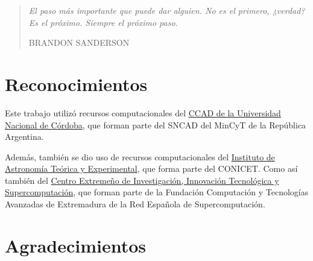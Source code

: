 \documentclass[spanish,a4paper,oneside,10pt,openright]{book}
\newenvironment{dedication}
    {\vspace{6ex}\begin{quotation}\begin{center}\begin{em}}
    {\par\end{em}\end{center}\end{quotation}}
\begin{document}
\setcounter{secnumdepth}{3}

 \cleardoublepage


\cleardoublepage






\begin{dedication}
\thispagestyle{empty}
\null\vfill

\begin{centering}
\parbox{10.5cm}{%
  \raggedright{\LARGE\itshape%
   El paso más importante que puede dar alguien. No es el primero, ¿verdad? \\ \vspace{0.35cm}
   Es el próximo. Siempre el próximo paso.\par\bigskip
  }   
  \raggedleft\large\MakeUppercase{Brandon Sanderson}\par%
}
\end{centering}

\hfill

\vfill
\end{dedication}


\chapter*{Reconocimientos}
Este trabajo utilizó recursos computacionales del \href{https://ccad.unc.edu.ar/}{CCAD de la Universidad Nacional de Córdoba}, que forman parte del SNCAD del MinCyT de la República Argentina.

Además, también se dio uso de recursos computacionales del \href{https://iate.oac.uncor.edu/}{Instituto de Astronomía Teórica y Experimental}, que forma parte del CONICET. Como así también del \href{https://cenits.es/}{Centro Extremeño de Investigación, Innovación Tecnológica y Supercomputación}, que forman parte de la Fundación Computación y Tecnologías Avanzadas de Extremadura de la Red Española de Supercomputación.



\chapter*{Agradecimientos} %

\end{document}
